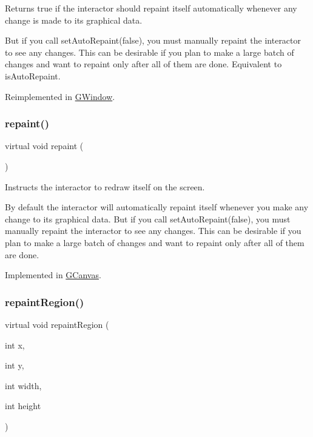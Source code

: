 Returns true if the interactor should repaint itself automatically whenever any change is made to its graphical data. 

But if you call set\+Auto\+Repaint(false), you must manually repaint the interactor to see any changes. This can be desirable if you plan to make a large batch of changes and want to repaint only after all of them are done. Equivalent to is\+Auto\+Repaint. 

Reimplemented in \mbox{\hyperlink{classGWindow_a45b1955433b8bf8a449a216b847d87f7}{G\+Window}}.

\mbox{\label{classGDrawingSurface_a4a8ae47b42f1e6a41b65d3546df46218}} 
\subsubsection{\texorpdfstring{repaint()}{repaint()}}
{\footnotesize\ttfamily virtual void repaint (\begin{DoxyParamCaption}{ }\end{DoxyParamCaption})\hspace{0.3cm}{\ttfamily [pure virtual]}}



Instructs the interactor to redraw itself on the screen. 

By default the interactor will automatically repaint itself whenever you make any change to its graphical data. But if you call set\+Auto\+Repaint(false), you must manually repaint the interactor to see any changes. This can be desirable if you plan to make a large batch of changes and want to repaint only after all of them are done. 

Implemented in \mbox{\hyperlink{classGCanvas_afb8dbc55702230f0030e47d6c009697f}{G\+Canvas}}.

\mbox{\label{classGDrawingSurface_a1a3898317080fecf8af21bbeaeeb37c3}} 
\subsubsection{\texorpdfstring{repaint\+Region()}{repaintRegion()}\hspace{0.1cm}{\footnotesize\ttfamily [1/2]}}
{\footnotesize\ttfamily virtual void repaint\+Region (\begin{DoxyParamCaption}\item[{int}]{x,  }\item[{int}]{y,  }\item[{int}]{width,  }\item[{int}]{height }\end{DoxyParamCaption})\hspace{0.3cm}{\ttfamily [pure virtual]}}



